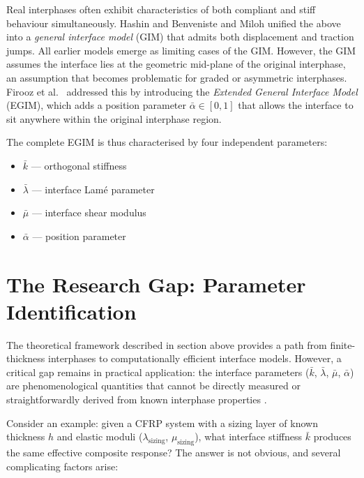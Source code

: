 \documentclass[oneside, 12pt, a4paper, bibliography=totoc]{book}
\begin{document}
Real interphases often exhibit characteristics of both compliant and stiff behaviour simultaneously. Hashin \cite{Hashin2002} and Benveniste and Miloh \cite{Benveniste2001} unified the above into a \textit{general interface model} (GIM) that admits both displacement and traction jumps. All earlier models emerge as limiting cases of the GIM. However, the GIM assumes the interface lies at the geometric mid-plane of the original interphase, an assumption that becomes problematic for graded or asymmetric interphases. Firooz et al.\ \cite{Firooz2019, Firooz2021} addressed this by introducing the \textit{Extended General Interface Model} (EGIM), which adds a position parameter $\bar{\alpha} \in [0, 1]$ that allows the interface to sit anywhere within the original interphase region.

The complete EGIM is thus characterised by four independent parameters:
%
\begin{itemize}
    \item $\bar{k}$ --- orthogonal stiffness 
    \item $\bar{\lambda}$ --- interface Lam\'{e} parameter
    \item $\bar{\mu}$ --- interface shear modulus 
    \item $\bar{\alpha}$ --- position parameter 
\end{itemize}
%

\section{The Research Gap: Parameter Identification}

The theoretical framework described in section above provides a path from finite-thickness interphases to computationally efficient interface models. However, a critical gap remains in practical application: the interface parameters ($\bar{k}$, $\bar{\lambda}$, $\bar{\mu}$, $\bar{\alpha}$) are phenomenological quantities that cannot be directly measured or straightforwardly derived from known interphase properties \cite{Firooz2021}.

Consider an example: given a CFRP system with a sizing layer of known thickness $h$ and elastic moduli ($\lambda_{\text{sizing}}$, $\mu_{\text{sizing}}$), what interface stiffness $\bar{k}$ produces the same effective composite response? The answer is not obvious, and several complicating factors arise:
\end{document}

